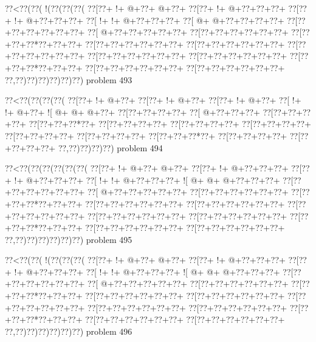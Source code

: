 \vbox{\vbox{\goo
\0??<\0??(\0??(\- !(\0??(\0??(\0??(
\0??[\0??+\- !+\- @+\0??+\- @+\0??+
\0??[\0??+\- !+\- @+\0??+\0??+\0??+
\0??[\0??+\- !+\- @+\0??+\0??+\0??+
\0??[\- !+\- !+\- @+\0??+\0??+\0??+
\0??[\- @+\- @+\0??+\0??+\0??+\0??+
\0??[\0??+\0??+\0??+\0??+\0??+\0??+
\0??[\- @+\0??+\0??+\0??+\0??+\0??+
\0??[\0??+\0??+\0??+\0??+\0??+\0??+
\0??[\0??+\0??+\0??*\0??+\0??+\0??+
\0??[\0??+\0??+\0??+\0??+\0??+\0??+
\0??[\0??+\0??+\0??+\0??+\0??+\0??+
\0??[\0??+\0??+\0??+\0??+\0??+\0??+
\0??[\0??+\0??+\0??+\0??+\0??+\0??+
\0??[\0??+\0??+\0??+\0??+\0??+\0??+
\0??[\0??+\0??+\0??*\0??+\0??+\0??+
\0??[\0??+\0??+\0??+\0??+\0??+\0??+
\0??[\0??+\0??+\0??+\0??+\0??+\0??+
\0??,\0??)\0??)\0??)\0??)\0??)\0??)
}
\hfil problem 493\hfil\break
}

\vbox{\vbox{\goo
\0??<\0??(\0??(\0??(\0??(
\0??[\0??+\- !+\- @+\0??+
\0??[\0??+\- !+\- @+\0??+
\0??[\0??+\- !+\- @+\0??+
\0??[\- !+\- !+\- @+\0??+
\- ![\- @+\- @+\- @+\0??+
\0??[\0??+\0??+\0??+\0??+
\0??[\- @+\0??+\0??+\0??+
\0??[\0??+\0??+\0??+\0??+
\0??[\0??+\0??+\0??*\0??+
\0??[\0??+\0??+\0??+\0??+
\0??[\0??+\0??+\0??+\0??+
\0??[\0??+\0??+\0??+\0??+
\0??[\0??+\0??+\0??+\0??+
\0??[\0??+\0??+\0??+\0??+
\0??[\0??+\0??+\0??*\0??+
\0??[\0??+\0??+\0??+\0??+
\0??[\0??+\0??+\0??+\0??+
\0??,\0??)\0??)\0??)\0??)
}
\hfil problem 494\hfil\break
}

\vbox{\vbox{\goo
\0??<\0??(\0??(\0??(\0??(\0??(\0??(
\0??[\0??+\- !+\- @+\0??+\- @+\0??+
\0??[\0??+\- !+\- @+\0??+\0??+\0??+
\0??[\0??+\- !+\- @+\0??+\0??+\0??+
\0??[\- !+\- !+\- @+\0??+\0??+\0??+
\- ![\- @+\- @+\- @+\0??+\0??+\0??+
\0??[\0??+\0??+\0??+\0??+\0??+\0??+
\0??[\- @+\0??+\0??+\0??+\0??+\0??+
\0??[\0??+\0??+\0??+\0??+\0??+\0??+
\0??[\0??+\0??+\0??*\0??+\0??+\0??+
\0??[\0??+\0??+\0??+\0??+\0??+\0??+
\0??[\0??+\0??+\0??+\0??+\0??+\0??+
\0??[\0??+\0??+\0??+\0??+\0??+\0??+
\0??[\0??+\0??+\0??+\0??+\0??+\0??+
\0??[\0??+\0??+\0??+\0??+\0??+\0??+
\0??[\0??+\0??+\0??*\0??+\0??+\0??+
\0??[\0??+\0??+\0??+\0??+\0??+\0??+
\0??[\0??+\0??+\0??+\0??+\0??+\0??+
\0??,\0??)\0??)\0??)\0??)\0??)\0??)
}
\hfil problem 495\hfil\break
}

\vbox{\vbox{\goo
\0??<\0??(\0??(\- !(\0??(\0??(\0??(
\0??[\0??+\- !+\- @+\0??+\- @+\0??+
\0??[\0??+\- !+\- @+\0??+\0??+\0??+
\0??[\0??+\- !+\- @+\0??+\0??+\0??+
\0??[\- !+\- !+\- @+\0??+\0??+\0??+
\- ![\- @+\- @+\- @+\0??+\0??+\0??+
\0??[\0??+\0??+\0??+\0??+\0??+\0??+
\0??[\- @+\0??+\0??+\0??+\0??+\0??+
\0??[\0??+\0??+\0??+\0??+\0??+\0??+
\0??[\0??+\0??+\0??*\0??+\0??+\0??+
\0??[\0??+\0??+\0??+\0??+\0??+\0??+
\0??[\0??+\0??+\0??+\0??+\0??+\0??+
\0??[\0??+\0??+\0??+\0??+\0??+\0??+
\0??[\0??+\0??+\0??+\0??+\0??+\0??+
\0??[\0??+\0??+\0??+\0??+\0??+\0??+
\0??[\0??+\0??+\0??*\0??+\0??+\0??+
\0??[\0??+\0??+\0??+\0??+\0??+\0??+
\0??[\0??+\0??+\0??+\0??+\0??+\0??+
\0??,\0??)\0??)\0??)\0??)\0??)\0??)
}
\hfil problem 496\hfil\break
}

